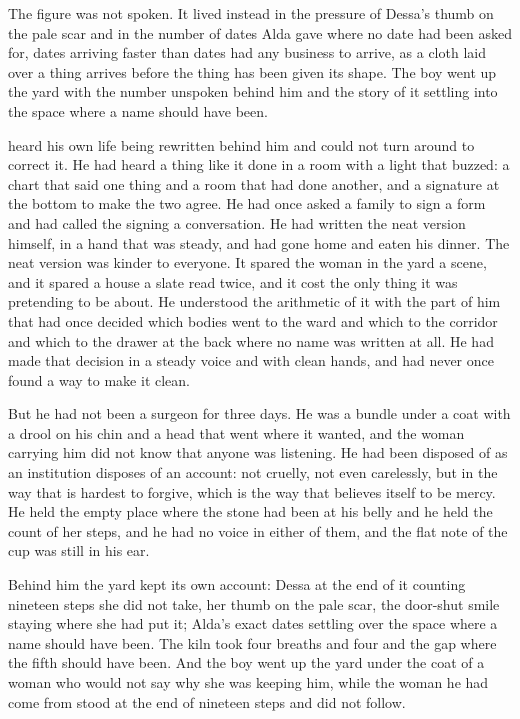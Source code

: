 The figure was not spoken. It lived instead in the pressure of Dessa's thumb on the pale scar and in the number of dates Alda gave where no date had been asked for, dates arriving faster than dates had any business to arrive, as a cloth laid over a thing arrives before the thing has been given its shape. The boy went up the yard with the number unspoken behind him and the story of it settling into the space where a name should have been.

 heard his own life being rewritten behind him and could not turn around to correct it. He had heard a thing like it done in a room with a light that buzzed: a chart that said one thing and a room that had done another, and a signature at the bottom to make the two agree. He had once asked a family to sign a form and had called the signing a conversation. He had written the neat version himself, in a hand that was steady, and had gone home and eaten his dinner. The neat version was kinder to everyone. It spared the woman in the yard a scene, and it spared a house a slate read twice, and it cost the only thing it was pretending to be about. He understood the arithmetic of it with the part of him that had once decided which bodies went to the ward and which to the corridor and which to the drawer at the back where no name was written at all. He had made that decision in a steady voice and with clean hands, and had never once found a way to make it clean.

But he had not been a surgeon for three days. He was a bundle under a coat with a drool on his chin and a head that went where it wanted, and the woman carrying him did not know that anyone was listening. He had been disposed of as an institution disposes of an account: not cruelly, not even carelessly, but in the way that is hardest to forgive, which is the way that believes itself to be mercy. He held the empty place where the stone had been at his belly and he held the count of her steps, and he had no voice in either of them, and the flat note of the cup was still in his ear.

Behind him the yard kept its own account: Dessa at the end of it counting nineteen steps she did not take, her thumb on the pale scar, the door-shut smile staying where she had put it; Alda's exact dates settling over the space where a name should have been. The kiln took four breaths and four and the gap where the fifth should have been. And the boy went up the yard under the coat of a woman who would not say why she was keeping him, while the woman he had come from stood at the end of nineteen steps and did not follow.
